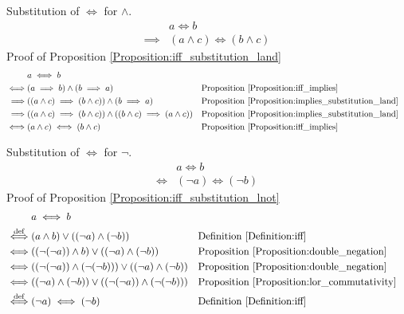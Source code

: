 \begin{prop}
\label{Proposition:iff_substitution_land}
Substitution of $\iff$ for $\land$.
\begin{align*}
& a \iff b \\
\implies & (a \land c) \iff (b \land c)
\end{align*}
Proof of Proposition \ref{Proposition:iff_substitution_land}
\begin{align*}
& a \iff b \\
\iff & (a \implies b) \land (b \implies a)
& & \text{Proposition \ref{Proposition:iff_implies}} \\
\implies & ((a \land c) \implies (b \land c)) \land (b \implies a)
& & \text{Proposition \ref{Proposition:implies_substitution_land}} \\
\implies & ((a \land c) \implies (b \land c)) \land ((b \land c) \implies (a \land c))
& & \text{Proposition \ref{Proposition:implies_substitution_land}} \\
\iff & (a \land c) \iff (b \land c)
& & \text{Proposition \ref{Proposition:iff_implies}} \\
\end{align*}
\end{prop}

\begin{prop}
\label{Proposition:iff_substitution_lnot}
Substitution of $\iff$ for $\lnot$.
\begin{align*}
& a \iff b \\
\iff & (\lnot a) \iff (\lnot b)
\end{align*}
Proof of Proposition \ref{Proposition:iff_substitution_lnot}
\begin{align*}
& a \iff b \\
\overset{\operatorname{def}}{\iff} & (a \land b) \lor ((\lnot a) \land (\lnot b))
& & \text{Definition \ref{Definition:iff}} \\
\iff & ((\lnot (\lnot a)) \land b) \lor ((\lnot a) \land (\lnot b))
& & \text{Proposition \ref{Proposition:double_negation}} \\
\iff & ((\lnot (\lnot a)) \land (\lnot (\lnot b))) \lor ((\lnot a) \land (\lnot b))
& & \text{Proposition \ref{Proposition:double_negation}} \\
\iff & ((\lnot a) \land (\lnot b)) \lor ((\lnot (\lnot a)) \land (\lnot (\lnot b)))
& & \text{Proposition \ref{Proposition:lor_commutativity}} \\
\overset{\operatorname{def}}{\iff} & (\lnot a) \iff (\lnot b)
& & \text{Definition \ref{Definition:iff}} \\
\end{align*}
\end{prop}

